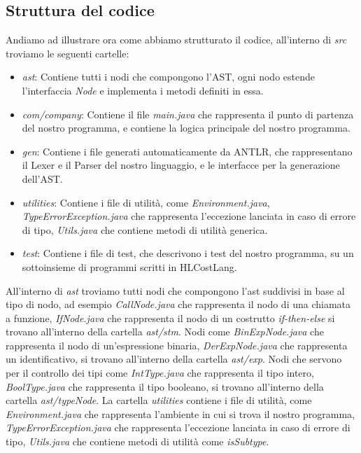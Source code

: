 \documentclass[../../main.tex]{subfiles}
\begin{document}
\subsection{Struttura del codice}
Andiamo ad illustrare ora come abbiamo strutturato il codice, all'interno di \textit{src} troviamo le seguenti cartelle:
\begin{itemize}
    \item \textit{ast}: Contiene tutti i nodi che compongono l'AST, ogni nodo estende l'interfaccia \textit{Node} e implementa i metodi definiti in essa.
    \item \textit{com/company}: Contiene il file \textit{main.java} che rappresenta il punto di partenza del nostro programma, e contiene la logica principale del nostro programma.
    \item \textit{gen}: Contiene i file generati automaticamente da ANTLR, che rappresentano il Lexer e il Parser del nostro linguaggio, e le interfacce per la generazione dell'AST.
    \item \textit{utilities}: Contiene i file di utilità, come \textit{Environment.java}, \textit{TypeErrorException.java} che rappresenta l'eccezione lanciata in caso di errore di tipo, \textit{Utils.java} che contiene metodi di utilità generica.
    \item \textit{test}: Contiene i file di test, che descrivono i test del nostro programma, su un sottoinsieme di programmi scritti in HLCostLang.
\end{itemize}
All'interno di \textit{ast} troviamo tutti nodi che compongono l'ast suddivisi in base al tipo di nodo, ad esempio \textit{CallNode.java} che rappresenta il nodo di una chiamata a funzione, \textit{IfNode.java} che rappresenta il nodo di un costrutto \textit{if-then-else} si trovano all'interno della cartella \textit{ast/stm}.
Nodi come \textit{BinExpNode.java} che rappresenta il nodo di un'espressione binaria, \textit{DerExpNode.java} che rappresenta un identificativo, si trovano all'interno della cartella \textit{ast/exp}.
Nodi che servono per il controllo dei tipi come \textit{IntType.java} che rappresenta il tipo intero, \textit{BoolType.java} che rappresenta il tipo booleano, si trovano all'interno della cartella \textit{ast/typeNode}.
La cartella \textit{utilities} contiene i file di utilità, come \textit{Environment.java} che rappresenta l'ambiente in cui si trova il nostro programma, \textit{TypeErrorException.java} che rappresenta l'eccezione lanciata in caso di errore di tipo, \textit{Utils.java} che contiene metodi di utilità come \textit{isSubtype}.\\
\end{document}

